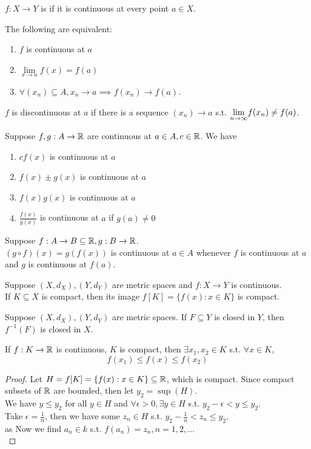 \documentclass[11pt]{article}
\begin{document}
$f: X \rightarrow Y$ is  if it is continuous at every point $a \in X$.

\property
The following are equivalent:
\begin{enumerate}
	\item $f$ is continuous at $a$
	\item $\underset{x \rightarrow a}{\lim} f(x) = f(a)$
	\item $\forall (x_n) \subseteq A, x_n \rightarrow a \implies f(x_n) \rightarrow f(a)$.
\end{enumerate}

\corollary $f$ is discontinuous at $a$ if there is a sequence $(x_n) \rightarrow a$ s.t. $\underset{n \rightarrow \infty}{\lim} f(x_n) \neq f(a)$.

\remark
{}

 Suppose $f, g: A \rightarrow \mathbb{R}$ are continuous at $a \in A, c \in \mathbb{R}$. We have
\begin{enumerate}
	\item $cf(x)$ is continuous at $a$
	\item $f(x) \pm g(x)$ is continuous at $a$
	\item $f(x)g(x)$ is continuous at $a$
	\item $\frac{f(x)}{g(x)}$ is continuous at $a$ if $g(a) \neq 0$
\end{enumerate}

\theorem Suppose $f: A \rightarrow B \subseteq \mathbb{R}, g: B \rightarrow \mathbb{R}$. \\
$(g \circ f)(x) = g(f(x))$ is continuous at $a \in A$ whenever $f$ is continuous at $a$ and $g$ is continuous at $f(a)$.

\theorem Suppose $(X, d_X), (Y, d_Y)$ are metric spaces and $f: X \rightarrow Y$ is continuous. \\
If $K \subseteq X$ is compact, then its image $f[K] = \{f(x): x \in K\}$ is compact.

\theorem Suppose $(X, d_X), (Y, d_Y)$ are metric spaces. If $F \subseteq Y$ is closed in $Y$, then $f^{-1}(F)$ is closed in $X$.

If $f: K \rightarrow \mathbb{R}$ is continuous, $K$ is compact, then $\exists x_1, x_2 \in K$ s.t. $\forall x \in K$,
$$f(x_1) \leq f(x) \leq f(x_2)$$
\begin{proof}
	Let $H = f[K] = \{f(x): x \in K\} \subseteq \mathbb{R}$, which is compact. Since compact subsets of $\mathbb{R}$ are bounded, then let $y_2 = \sup(H)$. \\
	We have $y \leq y_2$ for all $y \in H$ and $\forall \epsilon > 0, \exists y \in H$ s.t. $y_2 - \epsilon < y \leq y_2$.\\
	Take $\epsilon = \frac{1}{n}$, then we have some $z_n \in H$ s.t. $y_2 - \frac{1}{n} < z_n \leq y_2$. \\as
	Now we find $a_n \in k$ s.t. $f(a_n) = z_n, n = 1,2,\hdots$ \\
\end{proof}
\end{document}
